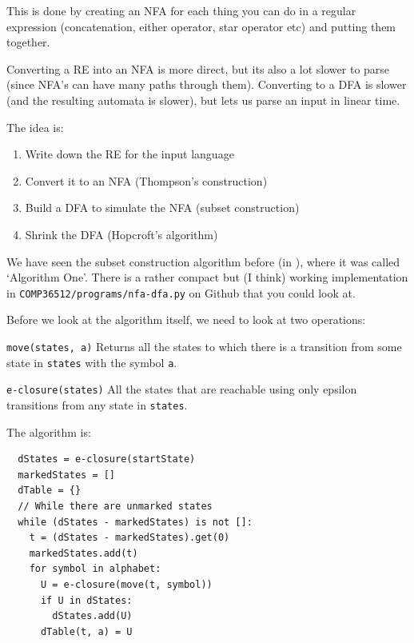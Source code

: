 This is done by creating an NFA for each thing you can do in a regular
expression (concatenation, either operator, star operator etc) and putting them
together.


Converting a RE into an NFA is more direct, but its also a lot slower to parse
(since NFA's can have many paths through them). Converting to a DFA is slower
(and the resulting automata is slower), but lets us parse an input in linear
time.

The idea is:


\begin{enumerate}
  \item Write down the RE for the input language
  \item Convert it to an NFA (Thompson's construction)
  \item Build a DFA to simulate the NFA (subset construction)
  \item Shrink the DFA (Hopcroft's algorithm)
\end{enumerate}



We have seen the subset construction algorithm before (in ),
where it was called `Algorithm One'. There is a rather compact but (I think)
working implementation in \texttt{COMP36512/programs/nfa-dfa.py} on Github that
you could look at.

Before we look at the algorithm itself, we need to look at two operations:

\begin{description}
  \item \texttt{move(states, a)} Returns all the states to which there is a
  transition from some state in \texttt{states} with the symbol \texttt{a}.
  \item \texttt{e-closure(states)} All the states that are reachable using only
  epsilon transitions from any state in \texttt{states}.
\end{description}

The algorithm is:

\begin{lstlisting}
  dStates = e-closure(startState)
  markedStates = []
  dTable = {}
  // While there are unmarked states
  while (dStates - markedStates) is not []:
    t = (dStates - markedStates).get(0)
    markedStates.add(t)
    for symbol in alphabet:
      U = e-closure(move(t, symbol))
      if U in dStates:
        dStates.add(U)
      dTable(t, a) = U
\end{lstlisting}

